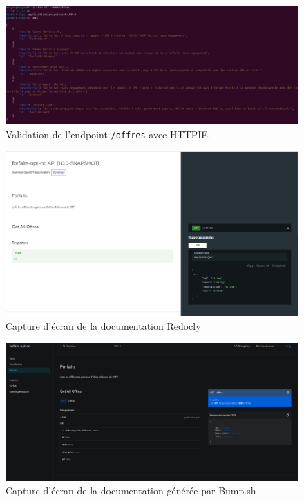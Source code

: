 \documentclass{article}
\begin{document}
	\begin{figure}[H]
		\centering
		\includegraphics[width=1\textwidth]{asset/endpoint offres.png}
		\caption{Validation de l'endpoint \texttt{/offres} avec HTTPIE.}
		\label{fig:offres_endpoint}
	\end{figure}
	\begin{figure}[H]
		\centering
		\includegraphics[width=\textwidth]{asset/redocly.png}
		\caption{Capture d'écran de la documentation Redocly}
		\label{fig:html_redocly}
	\end{figure}
	\begin{figure}[H]
		\centering
		\includegraphics[width=\textwidth]{asset/bump-sh-documentation.png}
		\caption{Capture d'écran de la documentation générée par Bump.sh}
		\label{fig:bumpsh}
	\end{figure}
\end{document}
